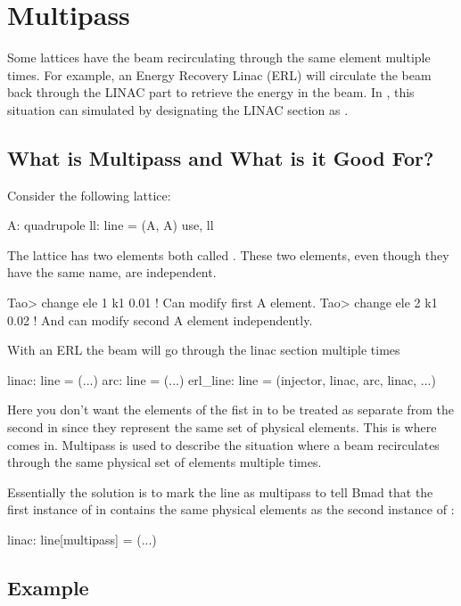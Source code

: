 \documentclass{hitec}
\newcommand{\Section}[1]{\section{#1}\vspace*{-1ex}}
\begin{document}
\Section{Multipass}
\label{s:multipass}

Some lattices have the beam recirculating through the same element multiple times. For example, an
Energy Recovery Linac (ERL) will circulate the beam back through the LINAC part to retrieve the
energy in the beam. In \bmad, this situation can simulated by designating the LINAC section as . 

\subsection{What is Multipass and What is it Good For?}

Consider the following lattice:
\begin{code}
A: quadrupole
ll: line = (A, A)
use, ll
\end{code}
The lattice has two elements both called . These two elements, even though they have the same name, are independent.
\begin{code}
Tao> change ele 1 k1 0.01   ! Can modify first A element.
Tao> change ele 2 k1 0.02   ! And can modify second A element independently.
\end{code}
With an ERL the beam will go through the linac section multiple times
\begin{code}
linac: line = (...)
arc: line = (...)
erl_line: line = (injector, linac, arc, linac, ...)
\end{code}
Here you don't want the elements of the fist  in  to be treated as separate
from the second  in  since they represent the same set of physical elements.
This is where  comes in.  Multipass is used to describe the situation where a beam
recirculates through the same physical set of elements multiple times.

Essentially the solution is to mark the  line as multipass to tell Bmad that the first instance of  in 
contains the same physical elements as the second instance of :
\begin{code}
linac: line[multipass] = (...)
\end{code}

\subsection{Example}
\end{document}
